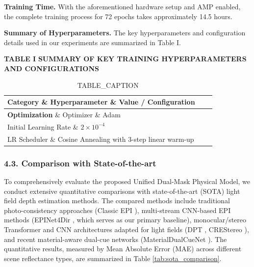 \textbf{Training Time.} 
With the aforementioned hardware setup and AMP enabled, the complete training process for 72 epochs takes approximately 14.5 hours.

\textbf{Summary of Hyperparameters.} 
The key hyperparameters and configuration details used in our experiments are summarized in Table I.

\textbf{TABLE I}
\textbf{SUMMARY OF KEY TRAINING HYPERPARAMETERS AND CONFIGURATIONS}

\begin{table}[htbp]
\centering
\caption{TABLE_CAPTION}
\begin{tabular}{lll}
\toprule
Category \& Hyperparameter \& Value / Configuration \\
\midrule
\textbf{Optimization} \& Optimizer \& Adam \\
Initial Learning Rate \& $2 \times 10^{-4}$ \\
LR Scheduler \& Cosine Annealing with 3-step linear warm-up \\
\bottomrule
\end{tabular}
\end{table}
\subsubsection{4.3. Comparison with State-of-the-art}

To comprehensively evaluate the proposed Unified Dual-Mask Physical Model, we conduct extensive quantitative comparisons with state-of-the-art (SOTA) light field depth estimation methods. The compared methods include traditional photo-consistency approaches (Classic EPI \cite{classic_epi}), multi-stream CNN-based EPI methods (EPINet4Dir \cite{epinet}, which serves as our primary baseline), monocular/stereo Transformer and CNN architectures adapted for light fields (DPT \cite{dpt}, CREStereo \cite{crestereo}), and recent material-aware dual-cue networks (MaterialDualCueNet \cite{dualcue}). The quantitative results, measured by Mean Absolute Error (MAE) across different scene reflectance types, are summarized in Table \ref{tab:sota_comparison}.

